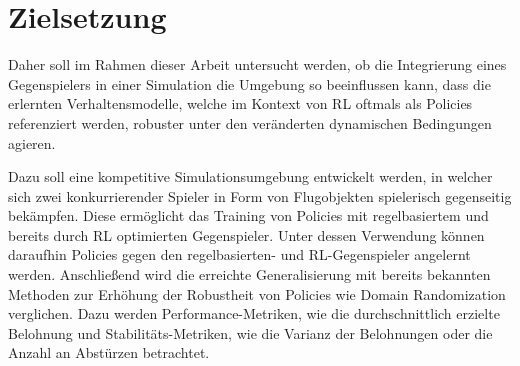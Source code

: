 \section{Zielsetzung}

Daher soll im Rahmen dieser Arbeit untersucht werden, ob die Integrierung eines Gegenspielers in einer Simulation die Umgebung so beeinflussen kann, dass die erlernten Verhaltensmodelle, welche im Kontext von RL oftmals als Policies referenziert werden, robuster unter den veränderten dynamischen Bedingungen agieren. %

Dazu soll eine kompetitive Simulationsumgebung entwickelt werden, in welcher sich zwei konkurrierender Spieler in Form von Flugobjekten spielerisch gegenseitig bekämpfen.
Diese ermöglicht das Training von Policies mit regelbasiertem und bereits durch RL optimierten Gegenspieler.
Unter dessen Verwendung können daraufhin Policies gegen den regelbasierten- und RL-Gegenspieler angelernt werden. 
Anschließend wird die erreichte Generalisierung mit bereits bekannten Methoden zur Erhöhung der Robustheit von Policies wie Domain Randomization verglichen.
Dazu werden Performance-Metriken, wie die durchschnittlich erzielte Belohnung und Stabilitäts-Metriken, wie die Varianz der Belohnungen oder die Anzahl an Abstürzen betrachtet. 


